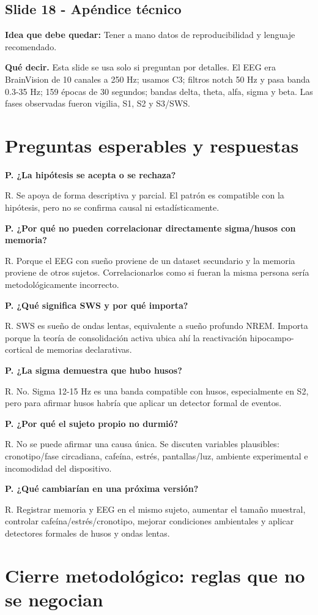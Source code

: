\documentclass[11pt,a4paper]{article}
\newcommand{\slidehead}[3]{%
\subsection*{Slide #1 - #2}\textbf{Idea que debe quedar:} #3\par}
\newcommand{\decir}{\textbf{Qué decir.} }
\begin{document}
\slidehead{18}{Apéndice técnico}{Tener a mano datos de reproducibilidad y lenguaje recomendado.}
\decir Esta slide se usa solo si preguntan por detalles. El EEG era BrainVision de 10 canales a 250 Hz; usamos C3; filtros notch 50 Hz y pasa banda 0.3-35 Hz; 159 épocas de 30 segundos; bandas delta, theta, alfa, sigma y beta. Las fases observadas fueron vigilia, S1, S2 y S3/SWS.

\newpage
\section{Preguntas esperables y respuestas}

\textbf{P. ¿La hipótesis se acepta o se rechaza?}\par
R. Se apoya de forma descriptiva y parcial. El patrón es compatible con la hipótesis, pero no se confirma causal ni estadísticamente.

\textbf{P. ¿Por qué no pueden correlacionar directamente sigma/husos con memoria?}\par
R. Porque el EEG con sueño proviene de un dataset secundario y la memoria proviene de otros sujetos. Correlacionarlos como si fueran la misma persona sería metodológicamente incorrecto.

\textbf{P. ¿Qué significa SWS y por qué importa?}\par
R. SWS es sueño de ondas lentas, equivalente a sueño profundo NREM. Importa porque la teoría de consolidación activa ubica ahí la reactivación hipocampo-cortical de memorias declarativas.

\textbf{P. ¿La sigma demuestra que hubo husos?}\par
R. No. Sigma 12-15 Hz es una banda compatible con husos, especialmente en S2, pero para afirmar husos habría que aplicar un detector formal de eventos.

\textbf{P. ¿Por qué el sujeto propio no durmió?}\par
R. No se puede afirmar una causa única. Se discuten variables plausibles: cronotipo/fase circadiana, cafeína, estrés, pantallas/luz, ambiente experimental e incomodidad del dispositivo.

\textbf{P. ¿Qué cambiarían en una próxima versión?}\par
R. Registrar memoria y EEG en el mismo sujeto, aumentar el tamaño muestral, controlar cafeína/estrés/cronotipo, mejorar condiciones ambientales y aplicar detectores formales de husos y ondas lentas.

\section{Cierre metodológico: reglas que no se negocian}
\end{document}

